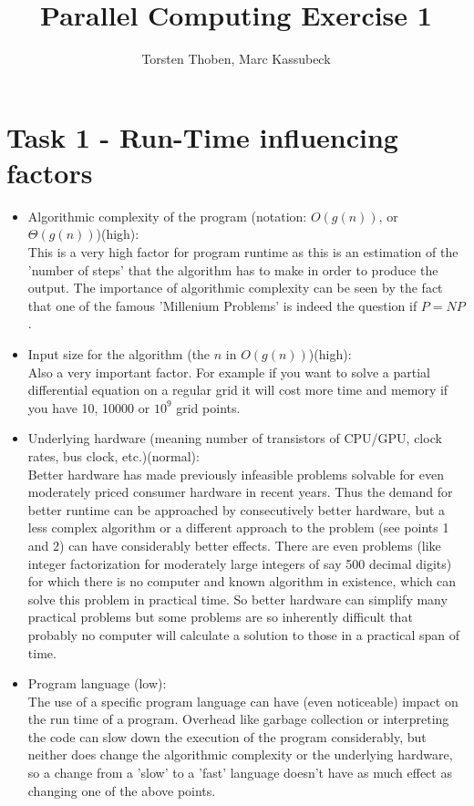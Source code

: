 \documentclass[10pt,a4paper]{article}
\title{Parallel Computing Exercise 1}
\date{}
\author{Torsten Thoben, Marc Kassubeck}
\begin{document}
\maketitle

\section{Task 1 - Run-Time influencing factors}
\begin{itemize}
\item Algorithmic complexity of the program (notation: $O(g(n))$, or $\Theta(g(n))$)(high):\\
This is a very high factor for program runtime as this is an estimation of the 'number of steps' that the algorithm has to make in order to produce the output. The importance of algorithmic complexity can be seen by the fact that one of the famous 'Millenium Problems' is indeed the question if $P=NP$.

\item Input size for the algorithm (the $n$ in $O(g(n))$)(high):\\
Also a very important factor. For example if you want to solve a partial differential equation on a regular grid it will cost more time and memory if you have 10, 10000 or $10^9$ grid points.

\item Underlying hardware (meaning number of transistors of CPU/GPU, clock rates, bus clock, etc.)(normal):\\
Better hardware has made previously infeasible problems solvable for even moderately priced consumer hardware in recent years. Thus the demand for better runtime can be approached by consecutively better hardware, but a less complex algorithm or a different approach to the problem (see points 1 and 2) can have considerably better effects. There are even problems (like integer factorization for moderately large integers of say 500 decimal digits) for which there is no computer and known algorithm in existence, which can solve this problem in practical time. So better hardware can simplify many practical problems but some problems are so inherently difficult that probably no computer will calculate a solution to those in a practical span of time.

\item Program language (low):\\
The use of a specific program language can have (even noticeable) impact on the run time of a program. Overhead like garbage collection or interpreting the code can slow down the execution of the program considerably, but neither does change the algorithmic complexity or the underlying hardware, so a change from a 'slow' to a 'fast' language doesn't have as much effect as changing one of the above points. 

\end{itemize}
\end{document}
